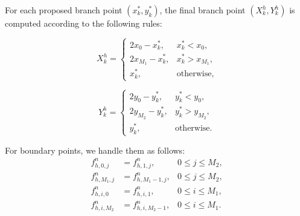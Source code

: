 \documentclass[11pt]{article}
\theoremstyle{mythm}
\theoremstyle{definition}
\begin{document}
	For each proposed branch point \((x_k^*, y_k^*)\), the final branch point \((X_k^h, Y_k^h)\) is computed according to the following rules:
	
	\begin{equation} \label{eq:x-reflection}
		X_k^h = 
		\begin{cases}
			2x_0 - x_k^*, & x_k^* < x_0, \\
			2x_{M_1} - x_k^*, & x_k^* > x_{M_1}, \\
			x_k^*, & \text{otherwise},
		\end{cases}
	\end{equation}
	
	\begin{equation} \label{eq:y-reflection}
		Y_k^h = 
		\begin{cases}
			2y_0 - y_k^*, & y_k^* < y_0, \\
			2y_{M_2} - y_k^*, & y_k^* > y_{M_2}, \\
			y_k^*, & \text{otherwise}.
		\end{cases}
	\end{equation}
	
	For boundary points, we handle them as follows:
	\[
	\begin{aligned}
		f_{h,0,j}^n &= f_{h,1,j}^n,      & 0\le j\le M_2,\\
		f_{h,M_1,j}^n &= f_{h,M_1-1,j}^n, & 0\le j\le M_2,\\
		f_{h,i,0}^n &= f_{h,i,1}^n,      & 0\le i\le M_1,\\
		f_{h,i,M_2}^n &= f_{h,i,M_2-1}^n, & 0\le i\le M_1.
	\end{aligned}
	\]
	
\end{document}
